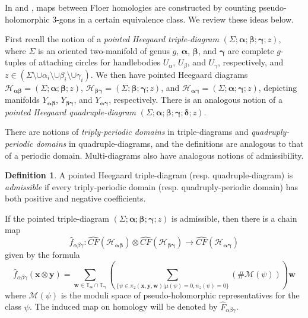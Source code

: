 \documentclass[11pt]{article}
\theoremstyle{plain} \newtheorem{thm}{Theorem}[subsection]
\theoremstyle{plain} \newtheorem{cor}[thm]{Corollary}
\theoremstyle{plain} \newtheorem{prop}[thm]{Proposition}
\theoremstyle{plain} \newtheorem{conj}[thm]{Conjecture}
\theoremstyle{plain} \newtheorem{lem}[thm]{Lemma}
\theoremstyle{definition} \newtheorem{df}[thm]{Definition}
\theoremstyle{remark} \newtheorem{rmk}[thm]{Remark}
\theoremstyle{remark} \newtheorem{obs}[thm]{Observation}
\newcommand{\h}{\mathcal{H}}
\newcommand{\ba}{\boldsymbol{\alpha}}
\newcommand{\bb}{\boldsymbol{\beta}}
\newcommand{\bg}{\boldsymbol{\gamma}}
\newcommand{\bd}{\boldsymbol{\delta}}
\newcommand{\Ta}{\mathbb{T}_{\ba}}
\newcommand{\Tg}{\mathbb{T}_{\bg}}
\newcommand{\bx}{\mathbf{x}}
\newcommand{\by}{\mathbf{y}}
\newcommand{\bw}{\mathbf{w}}
\newcommand{\Yab}{Y_{\ba\bb}}
\newcommand{\Ybg}{Y_{\bb\bg}}
\newcommand{\Yag}{Y_{\ba\bg}}
\begin{document}
In \cite{os:disk} and \cite{os:tri}, maps between Floer homologies are constructed by counting pseudo-holomorphic 3-gons in a certain equivalence class.  We review these ideas below.

First recall the notion of a \textit{pointed Heegaard triple-diagram} $\left(\Sigma; \ba; \bb; \bg; z\right)$, where $\Sigma$ is an oriented two-manifold of genus $g$, $\ba$, $\bb$, and $\bg$ are complete $g$-tuples of attaching circles for handlebodies $U_{\alpha}$, $U_{\beta}$, and $U_{\gamma}$, respectively, and $z \in (\Sigma \setminus \cup \alpha_{i} \setminus \cup \beta_{i} \setminus \cup \gamma_{i})$.  We then have pointed Heegaard diagrams $\h_{\ba\bb} = \left(\Sigma; \ba; \bb; z\right)$, $\h_{\bb\bg} = \left(\Sigma; \bb; \bg; z\right)$, and $\h_{\ba\bg} = \left(\Sigma; \ba; \bg; z\right)$, depicting manifolds $\Yab$, $\Ybg$, and $\Yag$, respectively.  There is an analogous notion of a \textit{pointed Heegaard quadruple-diagram} $\left(\Sigma; \ba; \bb; \bg; \bd; z\right)$.

There are notions of \textit{triply-periodic domains} in triple-diagrams and \textit{quadruply-periodic domains} in quadruple-diagrams, and the definitions are analogous to that of a periodic domain.  Multi-diagrams also have analogous notions of admissibility.

\begin{df}
A pointed Heegaard triple-diagram (resp. quadruple-diagram) is \textit{admissible} if every triply-periodic domain (resp. quadruply-periodic domain) has both positive and negative coefficients.
\end{df}

If the pointed triple-diagram $\left(\Sigma; \ba; \bb; \bg; z\right)$ is admissible, then there is a chain map
\begin{equation*}
\widehat{f}_{\alpha\beta\gamma}: \widehat{CF}(\h_{\ba\bb}) \otimes \widehat{CF}(\h_{\bb\bg}) \rightarrow \widehat{CF}(\h_{\ba\bg})
\end{equation*}
given by the formula
\begin{equation*}
\widehat{f}_{\alpha\beta\gamma}(\bx \otimes \by) =
\displaystyle\sum_{\bw \in \Ta \cap \Tg} \left( \displaystyle\sum_{\{\psi \in \pi_{2}(\bx, \by, \bw)| \mu(\psi) = 0, n_{z}(\psi) = 0\}} \left(\# \mathcal{M}\left(\psi\right)\right)\right)\bw
\end{equation*}
where $\mathcal{M}\left( \psi \right)$ is the moduli space of pseudo-holomorphic representatives for the class $\psi$.  The induced map on homology will be denoted by $\widehat{F}_{\alpha\beta\gamma}$.
\end{document}
